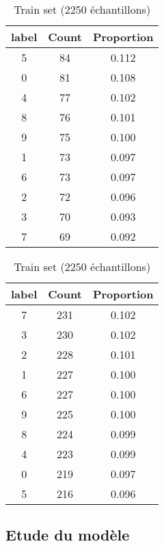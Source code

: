 \begin{table}[H]
    \centering
    \label{tab:data_distribution}
    \begin{minipage}{0.48\textwidth}
        \centering
        \caption{Test set (750 échantillons)}
        \begin{tabular}{|c|c|c|}
            \hline
            label & Count & Proportion \\
            \hline
            5 & 84 & 0.112 \\
            0 & 81 & 0.108 \\
            4 & 77 & 0.102 \\
            8 & 76 & 0.101 \\
            9 & 75 & 0.100 \\
            1 & 73 & 0.097 \\
            6 & 73 & 0.097 \\
            2 & 72 & 0.096 \\
            3 & 70 & 0.093 \\
            7 & 69 & 0.092 \\
            \hline
        \end{tabular}
    \end{minipage}\hfill
    \begin{minipage}{0.48\textwidth}
        \centering
        \caption{Train set (2250 échantillons)}
        \begin{tabular}{|c|c|c|}
            \hline
            label & Count & Proportion \\
            \hline
            7 & 231 & 0.102 \\
            3 & 230 & 0.102 \\
            2 & 228 & 0.101 \\
            1 & 227 & 0.100 \\
            6 & 227 & 0.100 \\
            9 & 225 & 0.100 \\
            8 & 224 & 0.099 \\
            4 & 223 & 0.099 \\
            0 & 219 & 0.097 \\
            5 & 216 & 0.096 \\
            \hline
        \end{tabular}
    \end{minipage}
\end{table}

\subsection{Etude du modèle}
\label{subsec:etude_model}

